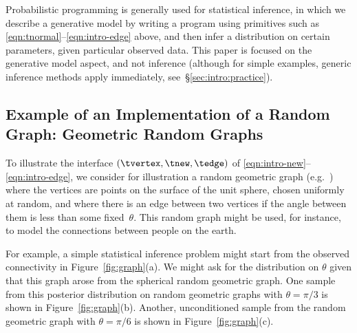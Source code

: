 Probabilistic programming is generally used for statistical inference, in which we describe a generative model by
writing a program using primitives such as \eqref{eqn:tnormal}--\eqref{eqn:intro-edge} above, and then infer a distribution on certain parameters, given particular observed data.  This paper is focused on the generative model aspect, and not inference (although for simple examples, generic inference methods apply immediately, see~\S\ref{sec:intro:practice}). 

\subsection{Example of an Implementation of a Random Graph: Geometric Random Graphs}
\label{sec:intro:graphs}

To illustrate the interface $(\tvertex,\tnew,\tedge)$ of
\eqref{eqn:intro-new}--\eqref{eqn:intro-edge},
we consider for illustration a random geometric graph (e.g.~\cite{penrose-rgg,https://doi.org/10.1002/rsa.20633}) where the vertices are
points on the surface of the unit sphere, chosen uniformly at random, and where there is an
edge between two vertices if the angle between them is less than
some fixed~$\theta$.
This random graph might be used, for instance, to model the connections between people on the earth.

For example, a simple statistical inference problem might start from the observed connectivity in Figure~\ref{fig:graph}(a). 
We might ask for the distribution on $\theta$ given that this graph arose from the spherical random geometric graph. One sample from this posterior distribution on random geometric graphs with $\theta=\pi/3$ is shown in Figure~\ref{fig:graph}(b). Another, unconditioned sample from the random geometric graph with $\theta=\pi/6$ is shown in Figure~\ref{fig:graph}(c).  

